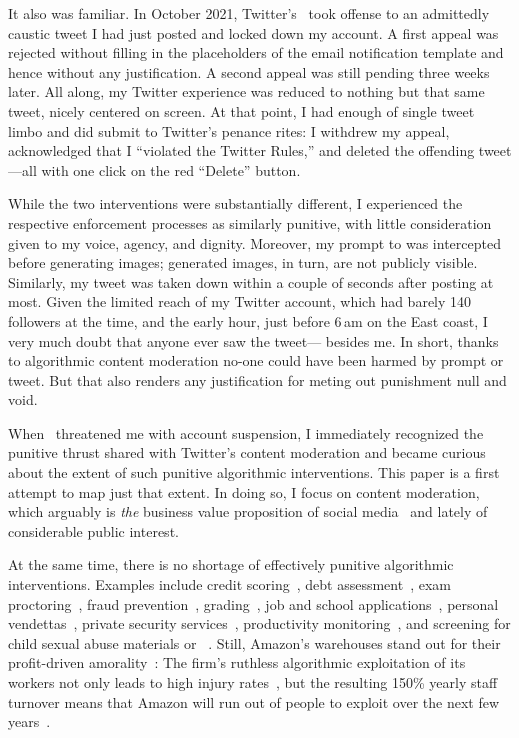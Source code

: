 It also was familiar. In October 2021, Twitter's \AI\ took offense to an
admittedly caustic tweet I had just posted and locked down my account. A first
appeal was rejected without filling in the placeholders of the email
notification template and hence without any justification. A second appeal was
still pending three weeks later. All along, my Twitter experience was reduced to
nothing but that same tweet, nicely centered on screen. At that point, I had
enough of single tweet limbo and did submit to Twitter's penance rites: I
withdrew my appeal, acknowledged that I ``violated the Twitter Rules,'' and
deleted the offending tweet---all with one click on the red ``Delete'' button.

While the two interventions were substantially different, I experienced the
respective enforcement processes as similarly punitive, with little
consideration given to my voice, agency, and dignity. Moreover, my prompt to
\DALLE{} was intercepted before generating images; generated images, in turn, are
not publicly visible. Similarly, my tweet was taken down within a couple of
seconds after posting at most. Given the limited reach of my Twitter account,
which had barely 140 followers at the time, and the early hour, just before
6$\,$am on the East coast, I very much doubt that anyone ever saw the tweet---%
besides me. In short, thanks to algorithmic content moderation no-one could have
been harmed by prompt or tweet. But that also renders any justification for
meting out punishment null and void.

When \DALLE\ threatened me with account suspension, I immediately recognized
the punitive thrust shared with Twitter's content moderation and became curious
about the extent of such punitive algorithmic interventions. This paper is a
first attempt to map just that extent. In doing so, I focus on content
moderation, which arguably is \emph{the} business value proposition of social
media~\cite{Masnick2022a,Patel2022a} and lately of considerable public interest.

At the same time, there is no shortage of effectively punitive algorithmic
interventions. Examples include credit scoring~\cite{Anonymous2018}, debt
assessment~\cite{Yampolskiy2015}, exam proctoring~\cite{FrancisWard2021b}, fraud
prevention~\cite{Kugel2022}, grading~\cite{Lam2020}, job and school
applications~\cite{Anonymous2016,Hall2012,Hall2020a,Stockton2020}, personal
vendettas~\cite{Casovan2022}, private security services~\cite{HaoSwart2022},
productivity
monitoring~\cite{Covert2022,HaoFreischlad2022,KantorSundaramea2022,Rosenblat2018},
and screening for child sexual abuse materials or \CSAM~\cite{Atherton2022a}.
Still, Amazon's warehouses stand out for their profit-driven
amorality~\cite{KantorWeiseea2021,Lennard2020}: The firm's ruthless algorithmic
exploitation of its workers not only leads to high injury
rates~\cite{Brown2019a,Clark2023,Sainato2021}, but the resulting 150\% yearly
staff turnover means that Amazon will run out of people to exploit over the next
few years~\cite{Sainato2022}.

